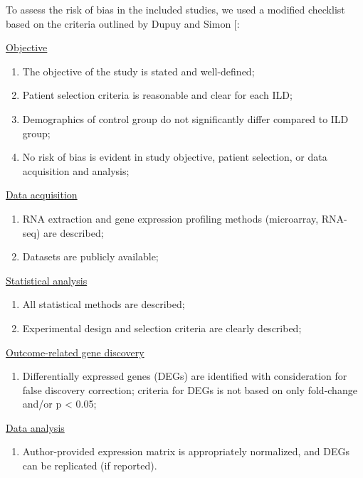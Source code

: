 \documentclass[
]{article}
\providecommand{\tightlist}{%
  \setlength{\itemsep}{0pt}\setlength{\parskip}{0pt}}
\begin{document}
To assess the risk of bias in the included studies, we used a modified checklist based on the criteria outlined by Dupuy and Simon {[}\citeproc{ref-dupuy_critical_2007}{40}{]}:

\underline{Objective}

\begin{enumerate}
\def\labelenumi{\arabic{enumi}.}
\tightlist
\item
  The objective of the study is stated and well-defined;
\item
  Patient selection criteria is reasonable and clear for each ILD;
\item
  Demographics of control group do not significantly differ compared to ILD group;
\item
  No risk of bias is evident in study objective, patient selection, or data acquisition and analysis;
\end{enumerate}

\underline{Data acquisition}

\begin{enumerate}
\def\labelenumi{\arabic{enumi}.}
\setcounter{enumi}{4}
\tightlist
\item
  RNA extraction and gene expression profiling methods (microarray, RNA-seq) are described;
\item
  Datasets are publicly available;
\end{enumerate}

\underline{Statistical analysis}

\begin{enumerate}
\def\labelenumi{\arabic{enumi}.}
\setcounter{enumi}{6}
\tightlist
\item
  All statistical methods are described;
\item
  Experimental design and selection criteria are clearly described;
\end{enumerate}

\underline{Outcome-related gene discovery}

\begin{enumerate}
\def\labelenumi{\arabic{enumi}.}
\setcounter{enumi}{8}
\tightlist
\item
  Differentially expressed genes (DEGs) are identified with consideration for false discovery correction; criteria for DEGs is not based on only fold-change and/or p \textless{} 0.05;
\end{enumerate}

\underline{Data analysis}

\begin{enumerate}
\def\labelenumi{\arabic{enumi}.}
\setcounter{enumi}{9}
\tightlist
\item
  Author-provided expression matrix is appropriately normalized, and DEGs can be replicated (if reported).
\end{enumerate}
\end{document}
